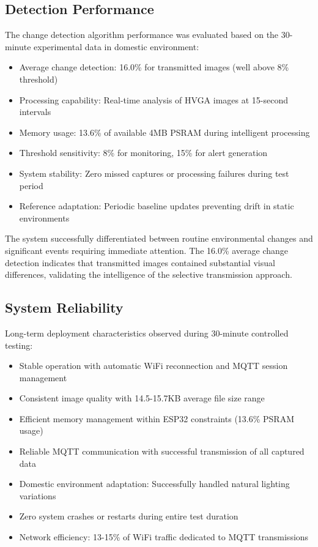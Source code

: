 \documentclass[conference]{IEEEtran}
\begin{document}
\subsection{Detection Performance}

The change detection algorithm performance was evaluated based on the 30-minute experimental data in domestic environment:

\begin{itemize}
\item Average change detection: 16.0\% for transmitted images (well above 8\% threshold)
\item Processing capability: Real-time analysis of HVGA images at 15-second intervals
\item Memory usage: 13.6\% of available 4MB PSRAM during intelligent processing
\item Threshold sensitivity: 8\% for monitoring, 15\% for alert generation
\item System stability: Zero missed captures or processing failures during test period
\item Reference adaptation: Periodic baseline updates preventing drift in static environments
\end{itemize}

The system successfully differentiated between routine environmental changes and significant events requiring immediate attention. The 16.0\% average change detection indicates that transmitted images contained substantial visual differences, validating the intelligence of the selective transmission approach.

\subsection{System Reliability}

Long-term deployment characteristics observed during 30-minute controlled testing:

\begin{itemize}
\item Stable operation with automatic WiFi reconnection and MQTT session management
\item Consistent image quality with 14.5-15.7KB average file size range
\item Efficient memory management within ESP32 constraints (13.6\% PSRAM usage)
\item Reliable MQTT communication with successful transmission of all captured data
\item Domestic environment adaptation: Successfully handled natural lighting variations
\item Zero system crashes or restarts during entire test duration
\item Network efficiency: 13-15\% of WiFi traffic dedicated to MQTT transmissions
\end{itemize}
\end{document}
